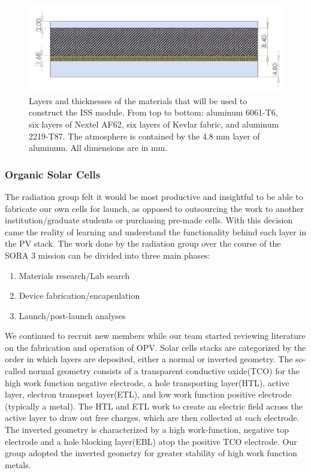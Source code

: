 \begin{figure}[h!]
	\begin{center}
		\includegraphics[width=\textwidth]{figures/iss-cross-section.png}
		\caption{Layers and thicknesses of the materials that will be used to construct the ISS module. From top to bottom: aluminum 6061-T6, six layers of Nextel AF62, six layers of Kevlar fabric, and aluminum 2219-T87. The atmosphere is contained by the 4.8 mm layer of aluminum. All dimensions are in mm.}
		\label{fig:iss-module}
	\end{center}
\end{figure}

\subsubsection{Organic Solar Cells}

The radiation group felt it would be most productive and insightful to be able to fabricate our own cells for launch, as opposed to outsourcing the work to another institution/graduate students or purchasing pre-made cells. With this decision came the reality of learning and understand the functionality behind each layer in the PV stack. The work done by the radiation group over the course of the SORA 3 mission can be divided into three main phases:
	
	\begin{enumerate}
		\item Materials research/Lab search
		\item Device fabrication/encapsulation
		\item Launch/post-launch analyses 
	\end{enumerate}
	
	We continued to recruit new members while our team started reviewing literature on the fabrication and operation of OPV. Solar cells stacks are categorized by the order in which layers are deposited, either a normal or inverted geometry. The so-called normal geometry consists of a transparent conductive oxide(TCO) for the high work function negative electrode, a hole transporting layer(HTL), active layer, electron transport layer(ETL), and low work function positive electrode (typically a metal). The HTL and ETL work to create an electric field across the active layer to draw out free charges, which are then collected at each electrode. The inverted geometry is characterized by a high work-function, negative top electrode and a hole blocking layer(EBL) atop the positive TCO electrode. Our group adopted the inverted geometry for greater stability of high work function metals.\\
	
